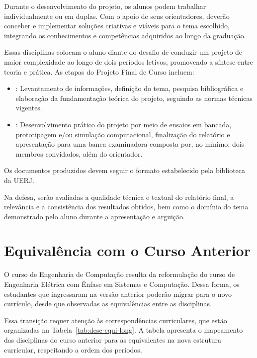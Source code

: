 Durante o desenvolvimento do projeto, os alunos podem trabalhar individualmente ou em duplas. Com o apoio de seus orientadores, deverão conceber e implementar soluções criativas e viáveis para o tema escolhido, integrando os conhecimentos e competências adquiridos ao longo da graduação.

Essas disciplinas colocam o aluno diante do desafio de conduzir um projeto de maior complexidade ao longo de dois períodos letivos, promovendo a síntese entre teoria e prática. As etapas do Projeto Final de Curso incluem:

\begin{itemize}
    \item \textbf{\ProjA}: Levantamento de informações, definição do tema, pesquisa bibliográfica e elaboração da fundamentação teórica do projeto, seguindo as normas técnicas vigentes.
    \item \textbf{\ProjB}: Desenvolvimento prático do projeto por meio de ensaios em bancada, prototipagem e/ou simulação computacional, finalização do relatório e apresentação para uma banca examinadora composta por, no mínimo, dois membros convidados, além do orientador.
\end{itemize}

Os documentos produzidos devem seguir o formato estabelecido pela biblioteca da UERJ.

Na defesa, serão avaliadas a qualidade técnica e textual do relatório final, a relevância e a consistência dos resultados obtidos, bem como o domínio do tema demonstrado pelo aluno durante a apresentação e arguição.

\section{Equivalência com o Curso Anterior}

O curso de Engenharia de Computação resulta da reformulação do curso de Engenharia Elétrica com Ênfase em Sistemas e Computação. Dessa forma, os estudantes que ingressaram na versão anterior poderão migrar para o novo currículo, desde que observadas as equivalências entre as disciplinas.

Essa transição requer atenção às correspondências curriculares, que estão organizadas na Tabela~\ref{tab:desc-equi-long}. A tabela apresenta o mapeamento das disciplinas do curso anterior para as equivalentes na nova estrutura curricular, respeitando a ordem dos períodos.

